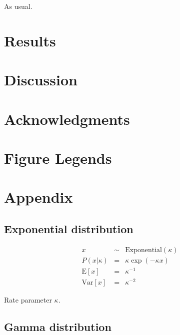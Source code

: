 \documentclass[10pt]{article}
\begin{document}
As usual.


\newpage
\section{Results}




\section{Discussion}


\newpage
\section{Acknowledgments}



\clearpage
\section{Figure Legends}

\clearpage
\section{Appendix}

\subsection{Exponential distribution}

\begin{eqnarray*}
x & \sim & \mbox{Exponential}(\kappa) \\
P(x|\kappa) & = & \kappa \exp(-\kappa x) \\
\mbox{E}[x] & = & \kappa^{-1} \\
\mbox{Var}[x] & = & \kappa^{-2}
\end{eqnarray*}

Rate parameter $\kappa$.


\subsection{Gamma distribution}
\end{document}
